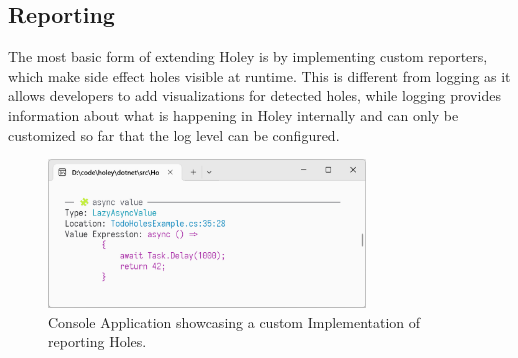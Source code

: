 \subsection{Reporting}
\label{sec:reporting}
The most basic form of extending Holey is by implementing custom reporters, which make side effect holes visible at runtime.
This is different from logging as it allows developers to add visualizations for detected holes, while logging provides information about what is happening in Holey internally and can only be customized so far that the log level can be configured.

\begin{figure}[ht]
    \centering
    \includegraphics[width=0.75\textwidth]{images/cli-reporting}
    \caption{Console Application showcasing a custom Implementation of reporting Holes.}
    \label{fig:holey-cli-reporting}
\end{figure}

